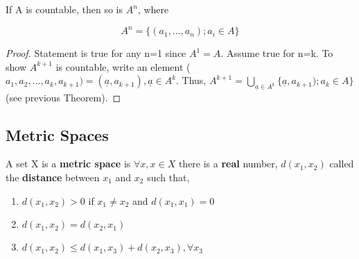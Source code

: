 \documentclass[11pt,fleqn]{book} %
\begin{document}
\begin{theorem}
	If A is countable, then so is $A^n$, where 

	$$A^n = \{ (a_1, \dots, a_n); a_i \in A\} $$
\end{theorem}

\begin{proof}
	Statement is true for any n=1 since $A^1 = A$. Assume true for n=k. To show $A^{k+1}$ is countable, write an element ($a_1, a_2, \dots, a_k, a_{k+1}) = (\underline{a}, a_{k+1}), \underline{a} \in A^k$. Thus, $A^{k+1} = \bigcup\limits_{\underline{a}\in A^k} \{\underline{a}, a_{k+1}); a_k \in A\} $ (see previous Theorem).
\end{proof}

\subsection{Metric Spaces} %

\begin{definition}
	A set X is a \textbf{metric space} is $\forall x, x \in X$ there is a \textbf{real} number, $d(x_1, x_2)$  called the \textbf{distance} between $x_1$ and $x_2$ such that,

	\begin{enumerate}[label = \alph*)]
		\item $d(x_1, x_2) > 0$ if $x_1 \neq x_2$ and $d(x_1, x_1) = 0$
		\item $d(x_1, x_2) = d(x_2, x_1)$
		\item $d(x_1, x_2) \le d(x_1, x_3) + d(x_2, x_3), \forall x_3$
	\end{enumerate}

\end{definition}
\end{document}
